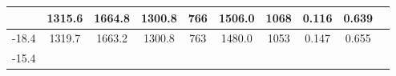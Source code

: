\documentclass[a4paper,12pt]{article}
\begin{document}
\begin{longtable}{
     |
%    
    c|
%    
    c|
%    
    c|
%    
    c|
%    
    c|
%    
    c|
%    
    c|
%    
    c|
%    
    c|
%    
    c|
%    
    }
%        
        & 1315.6
%        

%        

%        
        & 1664.8
%        

%        

%        
        & 1300.8
%        

%        

%        
        & 766
%        

%        

%        
        & 1506.0
%        

%        

%        
        & 1068
%        

%        

%        
        & 0.116
%        

%        

%        
        & 0.639
%        

%        
        \\
        \hline

        

%        

%        
        -18.4
%        

%        

%        
        & 1319.7
%        

%        

%        
        & 1663.2
%        

%        

%        
        & 1300.8
%        

%        

%        
        & 763
%        

%        

%        
        & 1480.0
%        

%        

%        
        & 1053
%        

%        

%        
        & 0.147
%        

%        

%        
        & 0.655
%        

%        
        \\
        \hline

        

%        

%        
        -15.4
%        

%        


\end{longtable}
\end{document}
